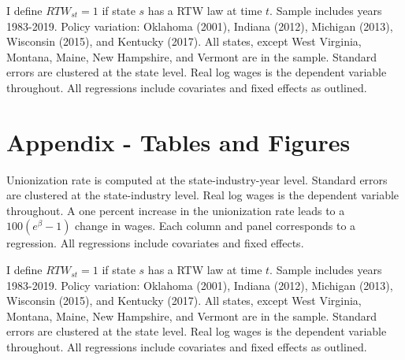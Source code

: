 \documentclass[11pt]{article}
\begin{document}
{\pagebreak
\begin{landscape}
\small{}
\footnotesize{I define $RTW_{st} = 1$ if state $s$ has a RTW law at time $t$. Sample includes years 1983-2019. Policy variation: Oklahoma (2001), Indiana (2012), Michigan (2013), Wisconsin (2015), and Kentucky (2017). All states, except West Virginia, Montana, Maine, New Hampshire, and Vermont are in the sample. Standard errors are clustered at the state level. Real log wages is the dependent variable throughout. All regressions include covariates and fixed effects as outlined.}
\end{landscape}

\pagebreak
\small{}

\pagebreak
\small{}

\pagebreak
\small{}

\pagebreak
\small{}

\pagebreak
\section{Appendix - Tables and Figures}
\small{}
\footnotesize{Unionization rate is computed at the state-industry-year level. Standard errors are clustered at the state-industry level. Real log wages is the dependent variable throughout. A one percent increase in the unionization rate leads to a $100(e^{\beta} - 1)$ change in wages. Each column and panel corresponds to a regression. All regressions include covariates and fixed effects.}

\pagebreak
\begin{landscape}
\small{}
\footnotesize{I define $RTW_{st} = 1$ if state $s$ has a RTW law at time $t$. Sample includes years 1983-2019. Policy variation: Oklahoma (2001), Indiana (2012), Michigan (2013), Wisconsin (2015), and Kentucky (2017). All states, except West Virginia, Montana, Maine, New Hampshire, and Vermont are in the sample. Standard errors are clustered at the state level. Real log wages is the dependent variable throughout. All regressions include covariates and fixed effects as outlined.}
\end{landscape}

}
\end{document}
